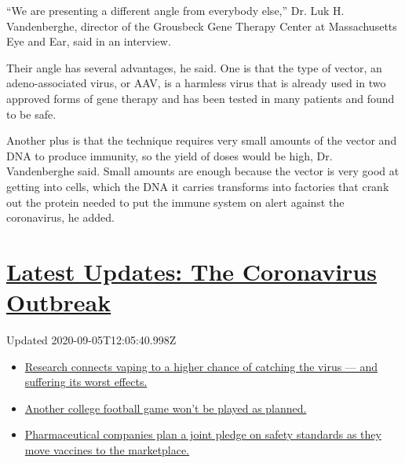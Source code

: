 ``We are presenting a different angle from everybody else,'' Dr. Luk H.
Vandenberghe, director of the Grousbeck Gene Therapy Center at
Massachusetts Eye and Ear, said in an interview.

Their angle has several advantages, he said. One is that the type of
vector, an adeno-associated virus, or AAV, is a harmless virus that is
already used in two approved forms of gene therapy and has been tested
in many patients and found to be safe.

Another plus is that the technique requires very small amounts of the
vector and DNA to produce immunity, so the yield of doses would be high,
Dr. Vandenberghe said. Small amounts are enough because the vector is
very good at getting into cells, which the DNA it carries transforms
into factories that crank out the protein needed to put the immune
system on alert against the coronavirus, he added.

\hypertarget{latest-updates-the-coronavirus-outbreak}{%
\section{\texorpdfstring{\href{https://www.nytimes3xbfgragh.onion/2020/09/04/world/covid-19-coronavirus.html?action=click\&pgtype=Article\&state=default\&region=MAIN_CONTENT_1\&context=storylines_live_updates}{Latest
Updates: The Coronavirus
Outbreak}}{Latest Updates: The Coronavirus Outbreak}}\label{latest-updates-the-coronavirus-outbreak}}

Updated 2020-09-05T12:05:40.998Z

\begin{itemize}
\tightlist
\item
  \href{https://www.nytimes3xbfgragh.onion/2020/09/04/world/covid-19-coronavirus.html?action=click\&pgtype=Article\&state=default\&region=MAIN_CONTENT_1\&context=storylines_live_updates\#link-1654f6ad}{Research
  connects vaping to a higher chance of catching the virus --- and
  suffering its worst effects.}
\item
  \href{https://www.nytimes3xbfgragh.onion/2020/09/04/world/covid-19-coronavirus.html?action=click\&pgtype=Article\&state=default\&region=MAIN_CONTENT_1\&context=storylines_live_updates\#link-52e4198a}{Another
  college football game won't be played as planned.}
\item
  \href{https://www.nytimes3xbfgragh.onion/2020/09/04/world/covid-19-coronavirus.html?action=click\&pgtype=Article\&state=default\&region=MAIN_CONTENT_1\&context=storylines_live_updates\#link-181cef0}{Pharmaceutical
  companies plan a joint pledge on safety standards as they move
  vaccines to the marketplace.}
\end{itemize}

